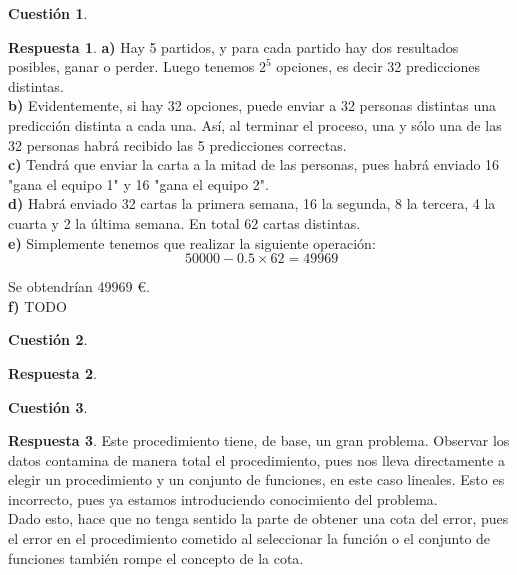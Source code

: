 \documentclass[10pt,a4paper]{article}
\theoremstyle{definition}
\newtheorem{cuestion}{Cuestión}
\newtheorem*{respuesta}{Respuesta}
\begin{document}
\begin{cuestion}
\end{cuestion}
\begin{respuesta}
\textbf{a)}
Hay 5 partidos, y para cada partido hay dos resultados posibles, ganar o perder. Luego tenemos $2^5$ opciones, es decir 32 predicciones distintas.\\

\textbf{b)}
Evidentemente, si hay 32 opciones, puede enviar a 32 personas distintas una predicción distinta a cada una. Así, al terminar el proceso, una y sólo una de las 32 personas habrá recibido las 5 predicciones correctas.\\

\textbf{c)}
Tendrá que enviar la carta a la mitad de las personas, pues habrá enviado 16 "gana el equipo 1" y 16 "gana el equipo 2".\\

\textbf{d)}
Habrá enviado 32 cartas la primera semana, 16 la segunda, 8 la tercera, 4 la cuarta y 2 la última semana. En total 62 cartas distintas.\\

\textbf{e)}
Simplemente tenemos que realizar la siguiente operación:\\

\[
\ 50000 - 0.5 \times 62 = 49969
\]

Se obtendrían 49969 \euro.\\

\textbf{f)}
TODO\\

\end{respuesta}

\begin{cuestion}
\end{cuestion}
\begin{respuesta}

\end{respuesta}

\begin{cuestion}
\end{cuestion}
\begin{respuesta}
Este procedimiento tiene, de base, un gran problema. Observar los datos contamina de manera total el procedimiento, pues nos lleva directamente a elegir un procedimiento y un conjunto de funciones, en este caso lineales. Esto es incorrecto, pues ya estamos introduciendo conocimiento del problema.\\

Dado esto, hace que no tenga sentido la parte de obtener una cota del error, pues el error en el procedimiento cometido al seleccionar la función o el conjunto de funciones también rompe el concepto de la cota.\\
 
\end{respuesta}
\end{document}

